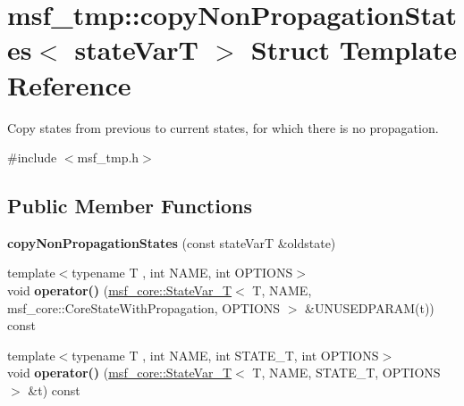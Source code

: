 \hypertarget{structmsf__tmp_1_1copyNonPropagationStates}{\section{msf\-\_\-tmp\-:\-:copy\-Non\-Propagation\-States$<$ state\-Var\-T $>$ Struct Template Reference}
\label{structmsf__tmp_1_1copyNonPropagationStates}
}


Copy states from previous to current states, for which there is no propagation.  




{\ttfamily \#include $<$msf\-\_\-tmp.\-h$>$}

\subsection*{Public Member Functions}
\begin{DoxyCompactItemize}
\item 
\hypertarget{structmsf__tmp_1_1copyNonPropagationStates_af80f8fe52f93fe2260e790378c7414fa}{{\bfseries copy\-Non\-Propagation\-States} (const state\-Var\-T \&oldstate)}\label{structmsf__tmp_1_1copyNonPropagationStates_af80f8fe52f93fe2260e790378c7414fa}

\item 
\hypertarget{structmsf__tmp_1_1copyNonPropagationStates_acd885c013431ce4fc1d9f78f768510d3}{{\footnotesize template$<$typename T , int N\-A\-M\-E, int O\-P\-T\-I\-O\-N\-S$>$ }\\void {\bfseries operator()} (\hyperlink{structmsf__core_1_1StateVar__T}{msf\-\_\-core\-::\-State\-Var\-\_\-\-T}$<$ T, N\-A\-M\-E, msf\-\_\-core\-::\-Core\-State\-With\-Propagation, O\-P\-T\-I\-O\-N\-S $>$ \&U\-N\-U\-S\-E\-D\-P\-A\-R\-A\-M(t)) const }\label{structmsf__tmp_1_1copyNonPropagationStates_acd885c013431ce4fc1d9f78f768510d3}

\item 
\hypertarget{structmsf__tmp_1_1copyNonPropagationStates_a752a5841f0ba47c8eee80d8dacdcc328}{{\footnotesize template$<$typename T , int N\-A\-M\-E, int S\-T\-A\-T\-E\-\_\-\-T, int O\-P\-T\-I\-O\-N\-S$>$ }\\void {\bfseries operator()} (\hyperlink{structmsf__core_1_1StateVar__T}{msf\-\_\-core\-::\-State\-Var\-\_\-\-T}$<$ T, N\-A\-M\-E, S\-T\-A\-T\-E\-\_\-\-T, O\-P\-T\-I\-O\-N\-S $>$ \&t) const }\label{structmsf__tmp_1_1copyNonPropagationStates_a752a5841f0ba47c8eee80d8dacdcc328}

\end{DoxyCompactItemize}


